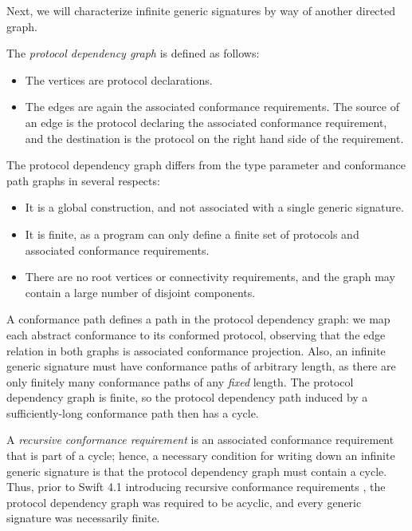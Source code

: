 \documentclass[../generics]{subfiles}
\begin{document}
Next, we will characterize infinite generic signatures by way of another directed graph.

\begin{definition}\label{protocol dependency graph def}
The \emph{protocol dependency graph} is defined as follows:
\begin{itemize}
\item The vertices are protocol declarations.
\item The edges are again the associated conformance requirements. The source of an edge is the protocol declaring the associated conformance requirement, and the destination is the protocol on the right hand side of the requirement.
\end{itemize}
\end{definition}
The protocol dependency graph differs from the type parameter and conformance path graphs in several respects:
\begin{itemize}
\item It is a global construction, and not associated with a single generic signature.
\item It is finite, as a program can only define a finite set of protocols and associated conformance requirements.
\item There are no root vertices or connectivity requirements, and the graph may contain a large number of disjoint components.
\end{itemize}

A conformance path defines a path in the protocol dependency graph: we map each abstract conformance to its conformed protocol, observing that the edge relation in both graphs is associated conformance projection. Also, an infinite generic signature must have conformance paths of arbitrary length, as there are only finitely many conformance paths of any \emph{fixed} length. The protocol dependency graph is finite, so the protocol dependency path induced by a sufficiently-long conformance path then has a cycle.

A \emph{recursive conformance requirement} is an associated conformance requirement that is part of a cycle; hence, a necessary condition for writing down an infinite generic signature is that the protocol dependency graph must contain a cycle. Thus, prior to Swift 4.1 introducing recursive conformance requirements \cite{se0157}, the protocol dependency graph was required to be acyclic, and every generic signature was necessarily finite.
\end{document}
